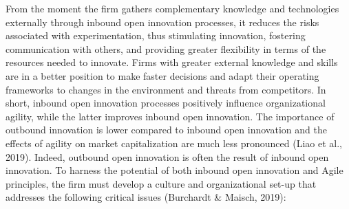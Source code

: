 \documentclass[
  letterpaper,
  DIV=11,
  numbers=noendperiod]{scrreprt}
\begin{document}
From the moment the firm gathers complementary knowledge and
technologies externally through inbound open innovation processes, it
reduces the risks associated with experimentation, thus stimulating
innovation, fostering communication with others, and providing greater
flexibility in terms of the resources needed to innovate. Firms with
greater external knowledge and skills are in a better position to make
faster decisions and adapt their operating frameworks to changes in the
environment and threats from competitors. In short, inbound open
innovation processes positively influence organizational agility, while
the latter improves inbound open innovation. The importance of outbound
innovation is lower compared to inbound open innovation and the effects
of agility on market capitalization are much less pronounced (Liao et
al., 2019). Indeed, outbound open innovation is often the result of
inbound open innovation. To harness the potential of both inbound open
innovation and Agile principles, the firm must develop a culture and
organizational set-up that addresses the following critical issues
(Burchardt \& Maisch, 2019):
\end{document}
